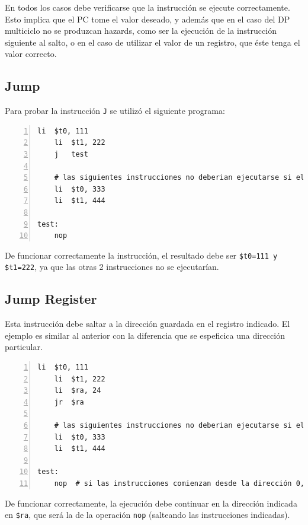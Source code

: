 \documentclass[11pt,a4paper, spanish]{article}
\begin{document}
En todos los casos debe verificarse que la instrucción se ejecute correctamente. Esto implica
que el PC tome el valor deseado, y además que en el caso del DP multiciclo no se produzcan
hazards, como ser la ejecución de la instrucción siguiente al salto, o en el caso de utilizar el valor
de un registro, que éste tenga el valor correcto.


\subsection{Jump}

Para probar la instrucción \texttt{J} se utilizó el siguiente programa:

\begin{lstlisting}[numbers=left, tabsize=2, basicstyle=\fontsize{11}{13}\ttfamily, frame=single, caption={Test j}]
	li	$t0, 111
	li	$t1, 222
	j	test

	# las siguientes instrucciones no deberian ejecutarse si el salto se realiza
	li	$t0, 333
	li	$t1, 444

test:
	nop
\end{lstlisting}

De funcionar correctamente la instrucción, el resultado debe ser \texttt{\$t0=111 y \$t1=222}, ya que las
otras 2 instrucciones no se ejecutarían.


\subsection{Jump Register}

Esta instrucción debe saltar a la dirección guardada en el registro indicado. El ejemplo es similar al
anterior con la diferencia que se espeficica una dirección particular.

\begin{lstlisting}[numbers=left, tabsize=2, basicstyle=\fontsize{11}{13}\ttfamily, frame=single, caption={Test jr}]
	li	$t0, 111
	li	$t1, 222
	li	$ra, 24
	jr	$ra

	# las siguientes instrucciones no deberian ejecutarse si el salto se realiza
	li	$t0, 333
	li	$t1, 444

test:
	nop  # si las instrucciones comienzan desde la dirección 0, esta tiene la dirección 24
\end{lstlisting}

De funcionar correctamente, la ejecución debe continuar en la dirección indicada en \texttt{\$ra}, que
será la de la operación \texttt{nop} (salteando las instrucciones indicadas).
\end{document}
